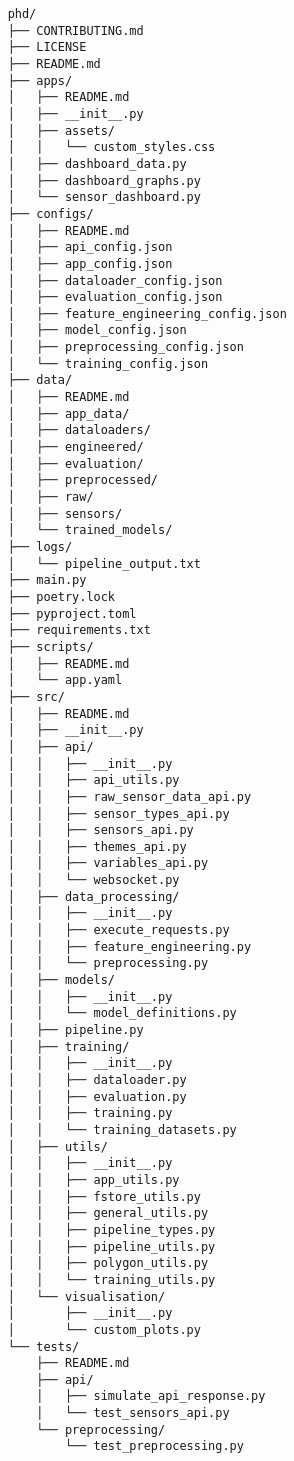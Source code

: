 \begin{verbatim}
    phd/
    ├── CONTRIBUTING.md
    ├── LICENSE
    ├── README.md
    ├── apps/
    │   ├── README.md
    │   ├── __init__.py
    │   ├── assets/
    │   │   └── custom_styles.css
    │   ├── dashboard_data.py
    │   ├── dashboard_graphs.py
    │   └── sensor_dashboard.py
    ├── configs/
    │   ├── README.md
    │   ├── api_config.json
    │   ├── app_config.json
    │   ├── dataloader_config.json
    │   ├── evaluation_config.json
    │   ├── feature_engineering_config.json
    │   ├── model_config.json
    │   ├── preprocessing_config.json
    │   └── training_config.json
    ├── data/
    │   ├── README.md
    │   ├── app_data/
    │   ├── dataloaders/
    │   ├── engineered/
    │   ├── evaluation/
    │   ├── preprocessed/
    │   ├── raw/
    │   ├── sensors/
    │   └── trained_models/
    ├── logs/
    │   └── pipeline_output.txt
    ├── main.py
    ├── poetry.lock
    ├── pyproject.toml
    ├── requirements.txt
    ├── scripts/
    │   ├── README.md
    │   └── app.yaml
    ├── src/
    │   ├── README.md
    │   ├── __init__.py
    │   ├── api/
    │   │   ├── __init__.py
    │   │   ├── api_utils.py
    │   │   ├── raw_sensor_data_api.py
    │   │   ├── sensor_types_api.py
    │   │   ├── sensors_api.py
    │   │   ├── themes_api.py
    │   │   ├── variables_api.py
    │   │   └── websocket.py
    │   ├── data_processing/
    │   │   ├── __init__.py
    │   │   ├── execute_requests.py
    │   │   ├── feature_engineering.py
    │   │   └── preprocessing.py
    │   ├── models/
    │   │   ├── __init__.py
    │   │   └── model_definitions.py
    │   ├── pipeline.py
    │   ├── training/
    │   │   ├── __init__.py
    │   │   ├── dataloader.py
    │   │   ├── evaluation.py
    │   │   ├── training.py
    │   │   └── training_datasets.py
    │   ├── utils/
    │   │   ├── __init__.py
    │   │   ├── app_utils.py
    │   │   ├── fstore_utils.py
    │   │   ├── general_utils.py
    │   │   ├── pipeline_types.py
    │   │   ├── pipeline_utils.py
    │   │   ├── polygon_utils.py
    │   │   └── training_utils.py
    │   └── visualisation/
    │       ├── __init__.py
    │       └── custom_plots.py
    └── tests/
        ├── README.md
        ├── api/
        │   ├── simulate_api_response.py
        │   └── test_sensors_api.py
        └── preprocessing/
            └── test_preprocessing.py
    \end{verbatim}
